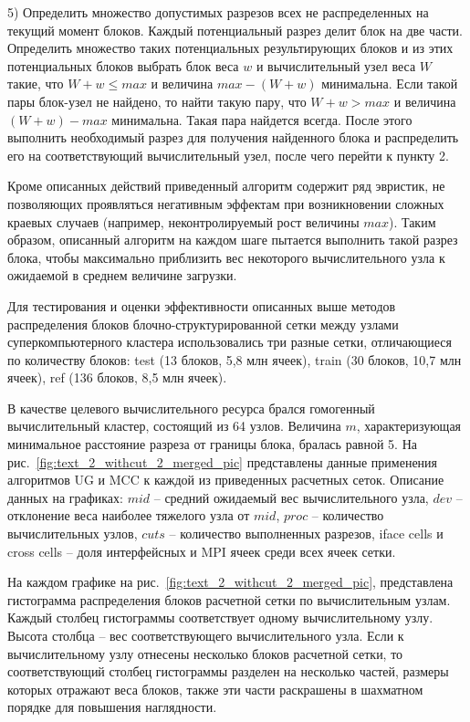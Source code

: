 5) Определить множество допустимых разрезов всех не распределенных на текущий момент блоков.
Каждый потенциальный разрез делит блок на две части.
Определить множество таких потенциальных результирующих блоков и из этих потенциальных блоков выбрать блок веса $w$ и вычислительный узел веса $W$ такие, что $W + w \le max$ и величина $max - (W + w)$ минимальна.
Если такой пары блок-узел не найдено, то найти такую пару, что $W + w > max$ и величина $(W + w) - max$ минимальна.
Такая пара найдется всегда.
После этого выполнить необходимый разрез для получения найденного блока и распределить его на соответствующий вычислительный узел, после чего перейти к пункту 2.

Кроме описанных действий приведенный алгоритм содержит ряд эвристик, не позволяющих проявляться негативным эффектам при возникновении сложных краевых случаев (например, неконтролируемый рост величины $max$). 
Таким образом, описанный  алгоритм на каждом шаге пытается выполнить такой разрез блока, чтобы максимально приблизить вес некоторого вычислительного узла к ожидаемой в среднем величине загрузки.

Для тестирования и оценки эффективности описанных выше методов распределения блоков блочно-структурированной сетки между узлами суперкомпьютерного кластера использовались три разные сетки, отличающиеся по количеству блоков: test (13 блоков, 5,8 млн ячеек), train (30 блоков, 10,7 млн ячеек), ref (136 блоков, 8,5 млн ячеек).

В качестве целевого вычислительного ресурса брался гомогенный вычислительный кластер\label{term:cluster_gomo2}, состоящий из 64 узлов.
Величина $m$, характеризующая минимальное расстояние разреза от границы блока, бралась равной 5.
На рис.~\ref{fig:text_2_withcut_2_merged_pic} представлены данные применения алгоритмов UG и MCC к каждой из приведенных расчетных сеток.
Описание данных на графиках: $mid$ -- средний ожидаемый вес вычислительного узла, $dev$ -- отклонение веса наиболее тяжелого узла от $mid$, $proc$ -- количество вычислительных узлов, $cuts$ -- количество выполненных разрезов, iface cells и cross cells -- доля интерфейсных и MPI ячеек среди всех ячеек сетки.

На каждом графике на рис.~\ref{fig:text_2_withcut_2_merged_pic}, представлена гистограмма распределения блоков расчетной сетки по вычислительным узлам.
Каждый столбец гистограммы соответствует одному вычислительному узлу.
Высота столбца -- вес соответствующего вычислительного узла.
Если к вычислительному узлу отнесены несколько блоков расчетной сетки, то соответствующий столбец гистограммы разделен на несколько частей, размеры которых отражают веса блоков, также эти части раскрашены в шахматном порядке для повышения наглядности.


